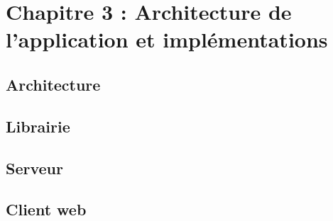 \chapter{Chapitre 3 : Architecture de l'application et implémentations}


\section{Architecture}

\section{Librairie}
\section{Serveur}
\section{Client web}
